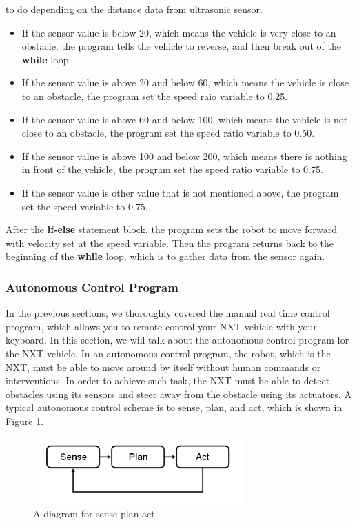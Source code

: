 \documentclass[11pt]{article}
\begin{document}
to do depending on the distance data from ultrasonic sensor.
\begin{itemize}
\item If the sensor value is below 20, which means the vehicle is very close 
    to an obstacle, the program tells the vehicle to reverse, and then break 
    out of the {\bf while} loop.
\item If the sensor value is above 20 and below 60, which means the vehicle 
    is close to an obstacle, the program set the speed raio variable to 0.25.
\item If the sensor value is above 60 and below 100, which means the vehicle 
    is not close to an obstacle, the program set the speed ratio variable to 
    0.50.
\item If the sensor value is above 100 and below 200, which means there is 
    nothing in front of the vehicle, the program set the speed ratio variable 
    to 0.75.
\item If the sensor value is other value that is not mentioned above, the 
    program set the speed variable to 0.75.
\end{itemize}
After the {\bf if-else} statement block, the program sets the robot to move 
forward with velocity set at the speed variable. Then the program returns back 
to the beginning of the {\bf while} loop, which is to gather data from the 
sensor again.

\subsubsection{Autonomous Control Program}
In the previous sections, we thoroughly covered the manual real time control 
program, which allows you to remote control your NXT vehicle with your keyboard.
In this section, we will talk about the autonomous control program for the NXT 
vehicle. In an autonomous control program, the robot, which is the NXT, must be 
able to move around by itself without human commands or interventions. In order 
to achieve such task, the NXT must be able to detect obstacles using its sensors 
and steer away from the obstacle using its actuators. A typical autonomous control 
scheme is to sense, plan, and act, which is shown in Figure \ref{fig_NXT_SPA}.
\begin{figure}[h]
  \begin{center}
    \includegraphics[height=1in]{figure/mindstorm/Senseplanact.png}
    \caption{A diagram for sense plan act.\label{fig_NXT_SPA}}
  \end{center}
\end{figure}
\end{document}
